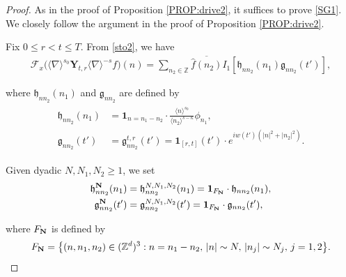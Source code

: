 \documentclass[letterpaper, 11pt,  reqno]{amsart}
\newcommand{\1}{\hspace{0.5mm}\textup{I}\hspace{0.5mm}}
\newcommand{\noi}{\noindent}
\newcommand{\Z}{\mathbb{Z}}
\newcommand{\nb}{\nabla}
\newcommand{\kk}{\kappa}
\newcommand{\ft}{\widehat}
\newcommand{\Ft}{{\mathcal{F}}}
\newcommand{\cj}{\overline}
\newcommand{\jb}[1]
{\langle #1 \rangle}
\newcommand{\ind}{\mathbf 1}
\newcommand{\YY}{\mathbf{Y}}
\newcommand{\hf}{\mathfrak{h}}
\newcommand{\ff}{\mathfrak{g}}
\numberwithin{equation}{section}
\numberwithin{theorem}{section}
\begin{document}
\begin{proof}


As in the proof of Proposition \ref{PROP:drive2}, 
it suffices to prove \eqref{SG1}.
We closely follow the argument 
in the proof of Proposition \ref{PROP:drive2}.

Fix  $0 \le r <  t \le T$.
From \eqref{sto2}, we have 
\begin{align}
\Ft_x\big(\jb{\nb}^{s_0}\YY_{t,r} \jb{\nb}^{-s}f \big)(n) 
=  \sum_{n_2\in \Z} \cj{\ft f (n_2)} I_1[ \hf_{nn_2}(n_1) \ff_{nn_2}(t') ] , 
\label{SG2}
\end{align}

\noi
where $\hf_{nn_2}(n_1) $ and $\ff_{nn_2}$ are defined by 
\begin{align}
\begin{split}
\hf_{n n_2}(n_1) & = 
 \ind_{n=n_1 - n_2}
\cdot
\frac{\jb{n}^{s_0}}{\jb{n_2}^{s-\kk}} \phi_{n_1} , \\
\ff_{nn_2} (t')  &= 
\ff_{nn_2}^{t, r} (t')= 
 \ind_{[r, t]}(t')\cdot 
 e^{ i w(t') (|n|^2 + |n_2|^2)}.
\end{split}
\label{SG3}
\end{align}



\noi
Given dyadic $N, N_1, N_2 \ge1$, we set 
\begin{align}
\begin{split}
\hf^{\bf N}_{n n_2}(n_1) & = 
\hf^{N, N_1, N_2}_{n n_2}(n_1)
= \ind_{F_{\bf N}}
\cdot 
 \hf_{n n_2}(n_1), \\
\ff^{\bf N}_{nn_2} (t')  &= 
\ff^{N, N_1, N_2}_{nn_2} (t')  = 
\ind_{F_{\bf N}}
\cdot 
\ff_{nn_2} (t'),  
\end{split}
\label{SG3a}
\end{align}


\noi
where $F_{\bf N}$ is defined by 
\begin{align}
F_{\bf N} = \big\{(n, n_1, n_2) \in (\Z^d)^3:
n = n_1 - n_2, \, |n|\sim N, \, |n_j|\sim N_j, \, j = 1, 2 \big\}.
\label{SEN1}
\end{align}


\end{proof}
\end{document}
